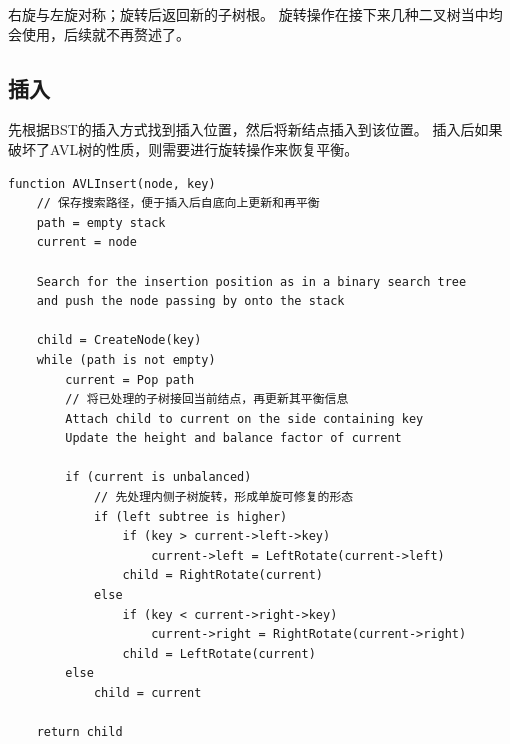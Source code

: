 \documentclass[openany]{book}
\begin{document}
右旋与左旋对称；旋转后返回新的子树根。
旋转操作在接下来几种二叉树当中均会使用，后续就不再赘述了。

\subsection{插入}
先根据BST的插入方式找到插入位置，然后将新结点插入到该位置。
插入后如果破坏了AVL树的性质，则需要进行旋转操作来恢复平衡。
\begin{lstlisting}
function AVLInsert(node, key)
    // 保存搜索路径，便于插入后自底向上更新和再平衡
    path = empty stack
    current = node

    Search for the insertion position as in a binary search tree
    and push the node passing by onto the stack

    child = CreateNode(key)
    while (path is not empty)
        current = Pop path
        // 将已处理的子树接回当前结点，再更新其平衡信息
        Attach child to current on the side containing key
        Update the height and balance factor of current

        if (current is unbalanced)
            // 先处理内侧子树旋转，形成单旋可修复的形态
            if (left subtree is higher)
                if (key > current->left->key)
                    current->left = LeftRotate(current->left)
                child = RightRotate(current)
            else
                if (key < current->right->key)
                    current->right = RightRotate(current->right)
                child = LeftRotate(current)
        else
            child = current

    return child
\end{lstlisting}
\end{document}
